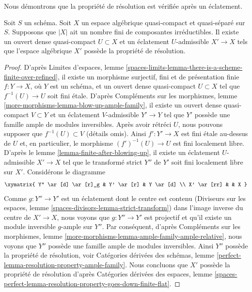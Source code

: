 \noindent
Nous démontrons que la propriété de résolution est vérifiée après un éclatement.

\begin{lemma}
\label{lemma-blow-up-resolution-property}
Soit $S$ un schéma. Soit $X$ un espace algébrique quasi-compact et quasi-séparé
sur $S$. Supposons que $|X|$ ait un nombre fini de composantes
irréductibles. Il existe un ouvert dense quasi-compact $U \subset X$
et un éclatement $U$-admissible $X' \to X$ tels que l'espace algébrique
$X'$ possède la propriété de résolution.
\end{lemma}

\begin{proof}
D'après Limites d'espaces, lemme
\ref{spaces-limits-lemma-there-is-a-scheme-finite-over-refined},
il existe un morphisme surjectif, fini et de présentation finie
$f : Y \to X$, où $Y$ est un schéma, et un ouvert dense quasi-compact
$U \subset X$ tel que $f^{-1}(U) \to U$ soit fini \'etale.
D'après Compléments sur les morphismes, lemme \ref{more-morphisms-lemma-blow-up-ample-family},
il existe un ouvert dense quasi-compact $V \subset Y$ et un éclatement $V$-admissible
$Y' \to Y$ tel que $Y'$ possède une famille ample de modules
inversibles. Après avoir rétréci $U$, nous pouvons supposer que $f^{-1}(U) \subset V$
(détails omis). Ainsi $f' : Y' \to X$ est fini \'etale au-dessus de $U$
et, en particulier, le morphisme $(f')^{-1}(U) \to U$ est fini localement libre.
D'après le lemme \ref{lemma-finite-after-blowing-up}, il existe un éclatement $U$-admissible
$X' \to X$ tel que le transformé strict $Y''$ de $Y'$
soit fini localement libre sur $X'$. Considérons le diagramme
$$
\xymatrix{
Y'' \ar[d] \ar[r]_g &
Y' \ar[r] &
Y \ar[d] \\
X' \ar[rr] & & X
}
$$
Comme $g : Y'' \to Y'$ est un éclatement dont le centre est contenu
(Diviseurs sur les espaces, lemme \ref{spaces-divisors-lemma-strict-transform})
dans l'image inverse du centre de $X' \to X$, nous voyons que
$g : Y'' \to Y'$ est projectif et qu'il existe un module inversible 
$g$-ample sur $Y''$. Par conséquent, d'après
Compléments sur les morphismes, lemme \ref{more-morphisms-lemma-ample-family-ample-relative},
nous voyons que $Y''$ possède une famille ample de modules inversibles.
Ainsi $Y''$ possède la propriété de résolution, voir
Catégories dérivées des schémas, lemme
\ref{perfect-lemma-resolution-property-ample-family}.
Nous concluons que $X'$ possède la propriété de résolution
d'après
Catégories dérivées des espaces, lemme
\ref{spaces-perfect-lemma-resolution-property-goes-down-finite-flat}.
\end{proof}

